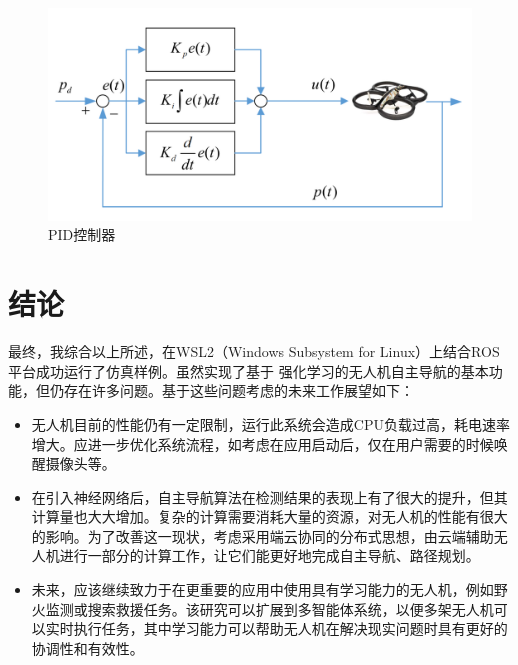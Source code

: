 \documentclass{thuemp}
\begin{document}
\begin{figure}
    \centering
    \includegraphics[width=0.8\linewidth]{./image/fig (4).png}
    \caption{PID控制器}
    \label{fig:my_label}
\end{figure}

\section{结论}
最终，我综合以上所述，在WSL2（Windows Subsystem for Linux）上结合ROS平台成功运行了仿真样例。虽然实现了基于 强化学习的无人机自主导航的基本功能，但仍存在许多问题。基于这些问题考虑的未来工作展望如下：
\begin{itemize}
    \item 无人机目前的性能仍有一定限制，运行此系统会造成CPU负载过高，耗电速率增大。应进一步优化系统流程，如考虑在应用启动后，仅在用户需要的时候唤醒摄像头等。
    \item 在引入神经网络后，自主导航算法在检测结果的表现上有了很大的提升，但其计算量也大大增加。复杂的计算需要消耗大量的资源，对无人机的性能有很大的影响。为了改善这一现状，考虑采用端云协同的分布式思想，由云端辅助无人机进行一部分的计算工作，让它们能更好地完成自主导航、路径规划。
    \item 未来，应该继续致力于在更重要的应用中使用具有学习能力的无人机，例如野火监测或搜索救援任务。该研究可以扩展到多智能体系统，以便多架无人机可以实时执行任务，其中学习能力可以帮助无人机在解决现实问题时具有更好的协调性和有效性。
\end{itemize}

\renewcommand\refname{\heiti\wuhao\centerline{参考文献}\global\def\refname{参考文献}}
\vskip 12pt

\let\OLDthebibliography\thebibliography
\renewcommand\thebibliography[1]{
  \OLDthebibliography{#1}
  \setlength{\parskip}{0pt}
  \setlength{\itemsep}{0pt plus 0.3ex}
}

{
\renewcommand{\baselinestretch}{0.9}
\liuhao


}
\end{document}

